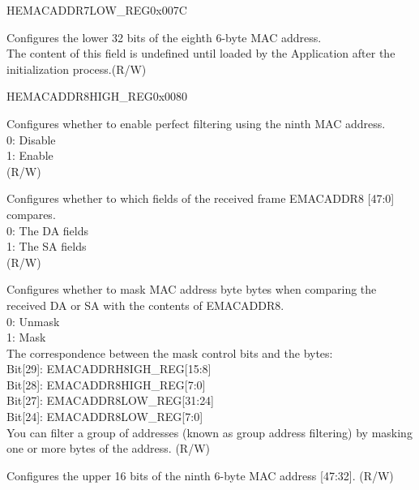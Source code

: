 \begin{register}{H}{EMACADDR7LOW\_REG}{0x007C}\label{regdesc:EMACADDR7LOWREG}
%
\regnewline%
\begin{regdesc}\begin{reglist}
\item [EMACADDR7LOW\_REG] Configures the lower 32 bits of the eighth 6-byte MAC address.\\The content of this field is undefined until loaded by the Application after the initialization process.(R/W)
\end{reglist}\end{regdesc}
\end{register}

\begin{register}{H}{EMACADDR8HIGH\_REG}{0x0080}\label{regdesc:EMACADDR8HIGHREG}
%
%
%
%
%
\regnewline%
\begin{regdesc}\begin{reglist}
\item [ADDRESS\_ENABLE8] Configures whether to enable perfect filtering using the ninth MAC address.\\
0: Disable\\
1: Enable\\ (R/W)
\item [SOURCE\_ADDRESS8] Configures whether to which fields of the received frame EMACADDR8 [47:0] compares.\\
0: The DA fields\\
1: The SA fields\\ (R/W)
\item [MASK\_BYTE\_CONTROL8] Configures whether to mask MAC address byte bytes when comparing the received DA or SA with the contents of EMACADDR8.\\
0: Unmask\\
1: Mask\\
The correspondence between the mask control bits and the bytes:\\
Bit[29]: EMACADDRH8IGH\_REG[15:8]\\
Bit[28]: EMACADDR8HIGH\_REG[7:0]\\
Bit[27]: EMACADDR8LOW\_REG[31:24]\\
Bit[24]: EMACADDR8LOW\_REG[7:0]\\
You can filter a group of addresses (known as group address filtering) by masking one or more bytes of the address. (R/W)
\item [MAC\_ADDRESS8\_HI] Configures the upper 16 bits of the ninth 6-byte MAC address [47:32]. (R/W)
\end{reglist}\end{regdesc}
\end{register}

